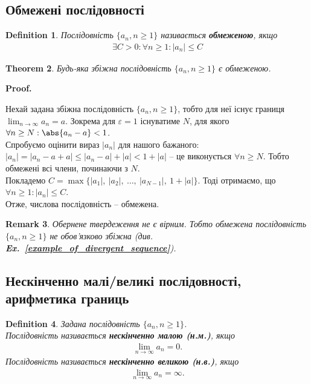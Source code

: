 \documentclass[a4paper, 14pt]{article}
\makeatletter
\def\qed{$\blacksquare$}
\theoremstyle{theoremdd}
\newtheorem{theorem}{Theorem}[subsection]
\theoremstyle{theoremdd}
\newtheorem{definition}[theorem]{Definition}
\theoremstyle{theoremdd}
\theoremstyle{theoremdd}
\theoremstyle{theoremdd}
\theoremstyle{theoremdd}
\newtheorem{remark}[theorem]{Remark}
\theoremstyle{theoremdd}
\theoremstyle{theoremdd}
\renewenvironment{proof}[1][Proof.\\]{\par
\pushQED{\hfill \qed}%
\normalfont \topsep6\p@\@plus6\p@\relax
\trivlist
\item\relax
{\bfseries
#1\@addpunct{.}}\hspace\labelsep\ignorespaces
}{%
\popQED\endtrivlist\@endpefalse
}
\newcommand\exref[1]{\textbf{Ex.~\ref{#1}}}
\makeatother
\begin{document}
	\subsection{Обмежені послідовності}
	\begin{definition}
	Послідовність $\{a_n, n \geq 1\}$ називається \textbf{обмеженою}, якщо
	\begin{align*}
	\exists C>0: \forall n \geq 1: |a_n|\leq C
	\end{align*}
	\end{definition}
	
	\begin{theorem}
	Будь-яка збіжна послідовність $\{a_n, n \geq 1\}$ є обмеженою.
	\end{theorem}
	
	\begin{proof}
	Нехай задана збіжна послідовність $\{a_n, n \geq 1\}$, тобто для неї існує границя $\displaystyle \lim_{n \to \infty} a_n = a$. Зокрема для $\varepsilon = 1$ існуватиме $N$, для якого $\forall n \geq N: \abs{a_n-a}<1$.\\
	Спробуємо оцінити вираз $|a_n|$ для нашого бажаного:\\
	$|a_n| = |a_n - a + a| \leq |a_n-a|+|a| < 1 + |a|$ -- це виконується $\forall n \geq N$. Тобто обмежені всі члени, починаючи з $N$.\\
	Покладемо $C=\max\{|a_1|, \ |a_2|, \ \ldots, \ |a_{N-1}|, \ 1+|a|\}$. Тоді отримаємо, що $\forall n\geq1: |a_n|\leq C$. \\ 
	Отже, числова послідовність -- обмежена.
	\end{proof}
	
	\begin{remark}
	Обернене твердеження не є вірним. Тобто обмежена послідовність $\{a_n, n \geq 1\}$ не обов'язково збіжна (див. \exref{example_of_divergent_sequence}).
	\end{remark}
	
	\subsection{Нескінченно малі/великі послідовності, арифметика границь}
	\begin{definition}
	Задана послідовність $\{a_n, n \geq 1\}$. \\
	Послідовність називається \textbf{нескінченно малою (н.м.)}, якщо
	\begin{align*}
	\lim_{n \to \infty} a_n = 0.
	\end{align*}
	Послідовність називається \textbf{нескінченно великою (н.в.)}, якщо
	\begin{align*}
	\lim_{n \to \infty} a_n = \infty.
	\end{align*}
	\end{definition}
	
\end{document}
